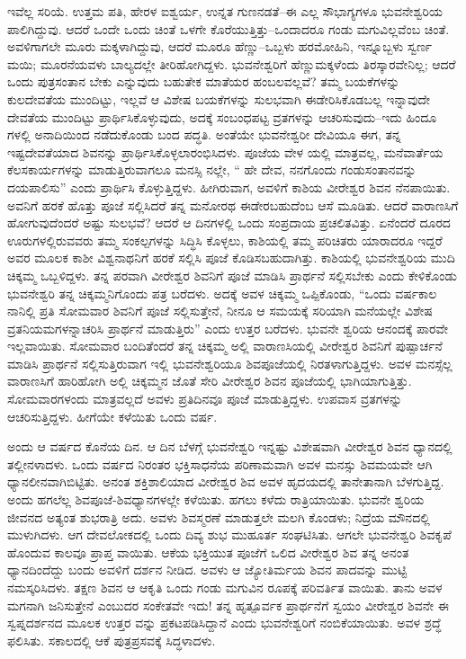 ಇವೆಲ್ಲ ಸರಿಯೆ. ಉತ್ತಮ ಪತಿ, ಹೇರಳ ಐಶ್ವರ್ಯ, ಉನ್ನತ ಗುಣನಡತೆ–ಈ ಎಲ್ಲ ಸೌಭಾಗ್ಯಗಳೂ ಭುವನೇಶ್ವರಿಯ ಪಾಲಿಗಿದ್ದುವು. ಆದರೆ ಒಂದೇ ಒಂದು ಚಿಂತೆ ಒಳಗೇ ಕೊರೆಯುತ್ತಿತ್ತು–ಒಂದಾದರೂ ಗಂಡು ಮಗುವಿಲ್ಲವೆಂಬ ಚಿಂತೆ. ಅವಳಿಗಾಗಲೇ ಮೂರು ಮಕ್ಕಳಾಗಿದ್ದುವು, ಆದರೆ ಮೂರೂ ಹೆಣ್ಣು–ಒಬ್ಬಳು ಹರಮೋಹಿನಿ, ಇನ್ನೂಬ್ಬಳು ಸ್ವರ್ಣ ಮಯಿ; ಮೂರನೆಯವಳು ಬಾಲ್ಯದಲ್ಲೇ ತೀರಿಹೋಗಿದ್ದಳು. ಭುವನೇಶ್ವರಿಗೆ ಹೆಣ್ಣುಮಕ್ಕಳೆಂದು ತಿರಸ್ಕಾರವೇನಿಲ್ಲ; ಆದರೆ ಒಂದು ಪುತ್ರಸಂತಾನ ಬೇಕು ಎನ್ನುವುದು ಬಹುತೇಕ ಮಾತೆಯರ ಹಂಬಲವಲ್ಲವೆ? ತಮ್ಮ ಬಯಕೆಗಳನ್ನು ಕುಲದೇವತೆಯ ಮುಂದಿಟ್ಟು, ಇಲ್ಲವೆ ಆ ವಿಶೇಷ ಬಯಕೆಗಳನ್ನು ಸುಲಭವಾಗಿ ಈಡೇರಿಸಿಕೊಡಬಲ್ಲ ಇನ್ನಾವುದೇ ದೇವತೆಯ ಮುಂದಿಟ್ಟು ಪ್ರಾರ್ಥಿಸಿಕೊಳ್ಳುವುದು, ಅದಕ್ಕೆ ಸಂಬಂಧಪಟ್ಟ ವ್ರತಗಳನ್ನು ಆಚರಿಸುವುದು–ಇದು ಹಿಂದೂ ಗಳಲ್ಲಿ ಅನಾದಿಯಿಂದ ನಡೆದುಕೊಂಡು ಬಂದ ಪದ್ಧತಿ. ಅಂತೆಯೇ ಭುವನೇಶ್ವರೀ ದೇವಿಯೂ ಈಗ, ತನ್ನ ಇಷ್ಟದೇವತೆಯಾದ ಶಿವನನ್ನು ಪ್ರಾರ್ಥಿಸಿಕೊಳ್ಳಲಾರಂಭಿಸಿದಳು. ಪೂಜೆಯ ವೇಳ ಯಲ್ಲಿ ಮಾತ್ರವಲ್ಲ, ಮನೆವಾರ್ತೆಯ ಕೆಲಸಕಾರ್ಯಗಳನ್ನು ಮಾಡುತ್ತಿರುವಾಗಲೂ ಮನಸ್ಸಿ ನಲ್ಲೇ, “ ಹೇ ದೇವ, ನನಗೊಂದು ಗಂಡುಸಂತಾನವನ್ನು ದಯಪಾಲಿಸು” ಎಂದು ಪ್ರಾರ್ಥಿಸಿ ಕೊಳ್ಳುತ್ತಿದ್ದಳು. ಹೀಗಿರುವಾಗ, ಅವಳಿಗೆ ಕಾಶಿಯ ವೀರೇಶ್ವರ ಶಿವನ ನೆನಪಾಯಿತು. ಅವನಿಗೆ ಹರಕೆ ಹೊತ್ತು ಪೂಜೆ ಸಲ್ಲಿಸಿದರೆ ತನ್ನ ಮನೋರಥ ಈಡೇರಬಹುದೆಂಬ ಆಸೆ ಮೂಡಿತು. ಆದರೆ ವಾರಾಣಸಿಗೆ ಹೋಗುವುದೆಂದರೆ ಅಷ್ಟು ಸುಲಭವೆ? ಆದರೆ ಆ ದಿನಗಳಲ್ಲಿ ಒಂದು ಸಂಪ್ರದಾಯ ಪ್ರಚಲಿತವಿತ್ತು. ಏನೆಂದರೆ ದೂರದ ಊರುಗಳಲ್ಲಿರುವವರು ತಮ್ಮ ಸಂಕಲ್ಪಗಳನ್ನು ಸಿದ್ಧಿಸಿ ಕೊಳ್ಳಲು, ಕಾಶಿಯಲ್ಲಿ ತಮ್ಮ ಪರಿಚಿತರು ಯಾರಾದರೂ ಇದ್ದರೆ ಅವರ ಮೂಲಕ ಕಾಶೀ ವಿಶ್ವನಾಥನಿಗೆ ಹರಕೆ ಸಲ್ಲಿಸಿ ಪೂಜೆ ಕೊಡಿಸಬಹುದಾಗಿತ್ತು. ಕಾಶಿಯಲ್ಲಿ ಭುವನೇಶ್ವರಿಯ ಮುದಿ ಚಿಕ್ಕಮ್ಮ ಒಬ್ಬಳಿದ್ದಳು. ತನ್ನ ಪರವಾಗಿ ವೀರೇಶ್ವರ ಶಿವನಿಗೆ ಪೂಜೆ ಮಾಡಿಸಿ ಪ್ರಾರ್ಥನೆ ಸಲ್ಲಿಸಬೇಕು ಎಂದು ಕೇಳಿಕೊಂಡು ಭುವನೇಶ್ವರಿ ತನ್ನ ಚಿಕ್ಕಮ್ಮನಿಗೊಂದು ಪತ್ರ ಬರೆದಳು. ಅದಕ್ಕೆ ಅವಳ ಚಿಕ್ಕಮ್ಮ ಒಪ್ಪಿಕೊಂಡು, “ಒಂದು ವರ್ಷಕಾಲ ನಾನಿಲ್ಲಿ ಪ್ರತಿ ಸೋಮವಾರ ಶಿವನಿಗೆ ಪೂಜೆ ಸಲ್ಲಿಸುತ್ತೇನೆ, ನೀನೂ ಆ ಸಮಯಕ್ಕೆ ಸರಿಯಾಗಿ ಮನೆಯಲ್ಲೇ ವಿಶೇಷ ವ್ರತನಿಯಮಗಳನ್ನಾಚರಿಸಿ ಪ್ರಾರ್ಥನೆ ಮಾಡುತ್ತಿರು” ಎಂದು ಉತ್ತರ ಬರೆದಳು. ಭುವನೇ ಶ್ವರಿಯ ಆನಂದಕ್ಕೆ ಪಾರವೇ ಇಲ್ಲವಾಯಿತು. ಸೋಮವಾರ ಬಂದಿತೆಂದರೆ ತನ್ನ ಚಿಕ್ಕಮ್ಮ ಅಲ್ಲಿ ವಾರಾಣಸಿಯಲ್ಲಿ ವೀರೇಶ್ವರ ಶಿವನಿಗೆ ಪುಷ್ಪಾರ್ಚನೆ ಮಾಡಿಸಿ ಪ್ರಾರ್ಥನೆ ಸಲ್ಲಿಸುತ್ತಿರುವಾಗ ಇಲ್ಲಿ ಭುವನೇಶ್ವರಿಯೂ ಶಿವಪೂಜೆಯಲ್ಲಿ ನಿರತಳಾಗುತ್ತಿದ್ದಳು. ಅವಳ ಮನಸ್ಸೆಲ್ಲ ವಾರಾಣಸಿಗೆ ಹಾರಿಹೋಗಿ ಅಲ್ಲಿ ಚಿಕ್ಕಮ್ಮನ ಜೊತೆ ಸೇರಿ ವೀರೇಶ್ವರ ಶಿವನ ಪೂಜೆಯಲ್ಲಿ ಭಾಗಿಯಾಗುತ್ತಿತ್ತು. ಸೋಮವಾರಗಳಂದು ಮಾತ್ರವಲ್ಲದೆ ಅವಳು ಪ್ರತಿದಿನವೂ ಪೂಜೆ ಮಾಡುತ್ತಿದ್ದಳು. ಉಪವಾಸ ವ್ರತಗಳನ್ನು ಆಚರಿಸುತ್ತಿದ್ದಳು. ಹೀಗೆಯೇ ಕಳೆಯಿತು ಒಂದು ವರ್ಷ.

ಅಂದು ಆ ವರ್ಷದ ಕೊನೆಯ ದಿನ. ಆ ದಿನ ಬೆಳಗ್ಗೆ ಭುವನೇಶ್ವರಿ ಇನ್ನಷ್ಟು ವಿಶೇಷವಾಗಿ ವೀರೇಶ್ವರ ಶಿವನ ಧ್ಯಾನದಲ್ಲಿ ತಲ್ಲೀನಳಾದಳು. ಒಂದು ವರ್ಷದ ನಿರಂತರ ಭಕ್ತಿಸಾಧನೆಯ ಪರಿಣಾಮವಾಗಿ ಅವಳ ಮನಸ್ಸು ಶಿವಮಯವೇ ಆಗಿ ಧ್ಯಾನಲೀನವಾಗಿಬಿಟ್ಟಿತು. ಅನಂತ ಶಕ್ತಿಶಾಲಿಯಾದ ವೀರೇಶ್ವರ ಶಿವ ಅವಳ ಹೃದಯದಲ್ಲಿ ತಾನೇತಾನಾಗಿ ಬೆಳಗುತ್ತಿದ್ದ. ಅಂದು ಹಗಲೆಲ್ಲ ಶಿವಪೂಜೆ-ಶಿವಧ್ಯಾನಗಳಲ್ಲೇ ಕಳೆಯಿತು. ಹಗಲು ಕಳೆದು ರಾತ್ರಿಯಾಯಿತು. ಭುವನೇ ಶ್ವರಿಯ ಜೀವನದ ಅತ್ಯಂತ ಶುಭರಾತ್ರಿ ಅದು. ಅವಳು ಶಿವಸ್ಮರಣೆ ಮಾಡುತ್ತಲೇ ಮಲಗಿ ಕೊಂಡಳು; ನಿದ್ರೆಯ ಮೌನದಲ್ಲಿ ಮುಳುಗಿದಳು. ಆಗ ದೇವಲೋಕದಲ್ಲಿ ಒಂದು ದಿವ್ಯ ಶುಭ ಮುಹೂರ್ತ ಸಂಘಟಿಸಿತು. ಆಗಲೇ ಭುವನೇಶ್ವರಿ ಶಿವಕೃಪೆ ಹೊಂದುವ ಕಾಲವೂ ಪ್ರಾಪ್ತ ವಾಯಿತು. ಆಕೆಯ ಭಕ್ತಿಯುತ ಪೂಜೆಗೆ ಒಲಿದ ವೀರೇಶ್ವರ ಶಿವ ತನ್ನ ಅನಂತ ಧ್ಯಾನದಿಂದೆದ್ದು ಬಂದು ಅವಳಿಗೆ ದರ್ಶನ ನೀಡಿದ. ಅವಳು ಆ ಜ್ಯೋತಿರ್ಮಯ ಶಿವನ ಪಾದವನ್ನು ಮುಟ್ಟಿ ನಮಸ್ಕರಿಸಿದಳು. ತಕ್ಷಣ ಶಿವನ ಆ ಆಕೃತಿ ಒಂದು ಗಂಡು ಮಗುವಿನ ರೂಪಕ್ಕೆ ಪರಿವರ್ತಿತ ವಾಯಿತು. ತಾನು ಅವಳ ಮಗನಾಗಿ ಜನಿಸುತ್ತೇನೆ ಎಂಬುದರ ಸಂಕೇತವೇ ಇದು! ತನ್ನ ಹೃತ್ಪೂರ್ವಕ ಪ್ರಾರ್ಥನೆಗೆ ಸ್ವಯಂ ವೀರೇಶ್ವರ ಶಿವನೇ ಈ ಸ್ವಪ್ನದರ್ಶನದ ಮೂಲಕ ಉತ್ತರ ವನ್ನು ಪ್ರಕಟಪಡಿಸಿದ್ದಾನೆ ಎಂದು ಭುವನೇಶ್ವರಿಗೆ ನಂಬಿಕೆಯಾಯಿತು. ಅವಳ ಶ್ರದ್ಧೆ ಫಲಿಸಿತು. ಸಕಾಲದಲ್ಲಿ ಆಕೆ ಪುತ್ರಪ್ರಸವಕ್ಕೆ ಸಿದ್ಧಳಾದಳು.

